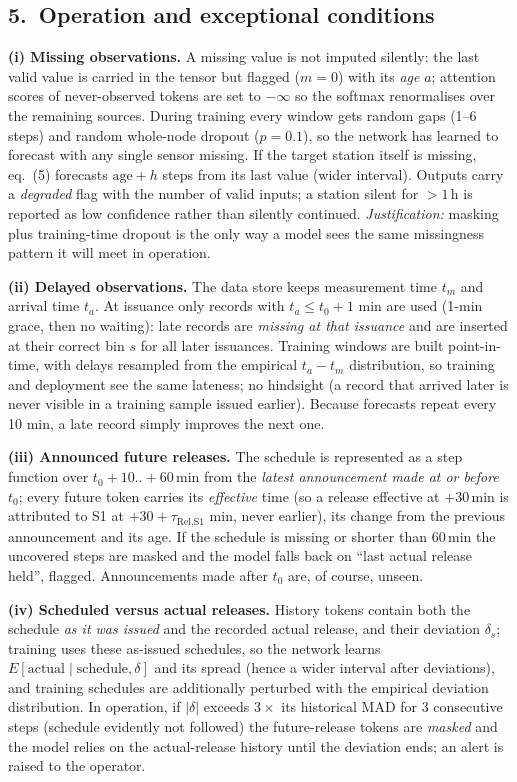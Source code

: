 \subsection*{5.\ Operation and exceptional conditions}
\noindent\textbf{(i) Missing observations.} A missing value is not imputed silently: the last valid value is carried in the tensor but flagged ($m{=}0$) with its \emph{age} $a$; attention scores of never-observed tokens are set to $-\infty$ so the softmax renormalises over the remaining sources. During training every window gets random gaps (1--6 steps) and random whole-node dropout ($p{=}0.1$), so the network has learned to forecast with any single sensor missing. If the target station itself is missing, eq.\ (5) forecasts $\mathrm{age}+h$ steps from its last value (wider interval). Outputs carry a \emph{degraded} flag with the number of valid inputs; a station silent for $>1$\,h is reported as low confidence rather than silently continued. \emph{Justification:} masking plus training-time dropout is the only way a model sees the same missingness pattern it will meet in operation.

\noindent\textbf{(ii) Delayed observations.} The data store keeps measurement time $t_m$ and arrival time $t_a$. At issuance only records with $t_a\le t_0+1$ min are used (1-min grace, then no waiting): late records are \emph{missing at that issuance} and are inserted at their correct bin $s$ for all later issuances. Training windows are built point-in-time, with delays resampled from the empirical $t_a-t_m$ distribution, so training and deployment see the same lateness; no hindsight (a record that arrived later is never visible in a training sample issued earlier). Because forecasts repeat every 10 min, a late record simply improves the next one.

\noindent\textbf{(iii) Announced future releases.} The schedule is represented as a step function over $t_0{+}10..{+}60$\,min from the \emph{latest announcement made at or before $t_0$}; every future token carries its \emph{effective} time (so a release effective at $+30$\,min is attributed to S1 at $+30{+}\tau_{\text{Rel,S1}}$ min, never earlier), its change from the previous announcement and its age. If the schedule is missing or shorter than 60\,min the uncovered steps are masked and the model falls back on ``last actual release held'', flagged. Announcements made after $t_0$ are, of course, unseen.

\noindent\textbf{(iv) Scheduled versus actual releases.} History tokens contain both the schedule \emph{as it was issued} and the recorded actual release, and their deviation $\delta_s$; training uses these as-issued schedules, so the network learns $E[\text{actual}\mid\text{schedule},\delta]$ and its spread (hence a wider interval after deviations), and training schedules are additionally perturbed with the empirical deviation distribution. In operation, if $|\delta|$ exceeds $3\times$ its historical MAD for 3 consecutive steps (schedule evidently not followed) the future-release tokens are \emph{masked} and the model relies on the actual-release history until the deviation ends; an alert is raised to the operator.

